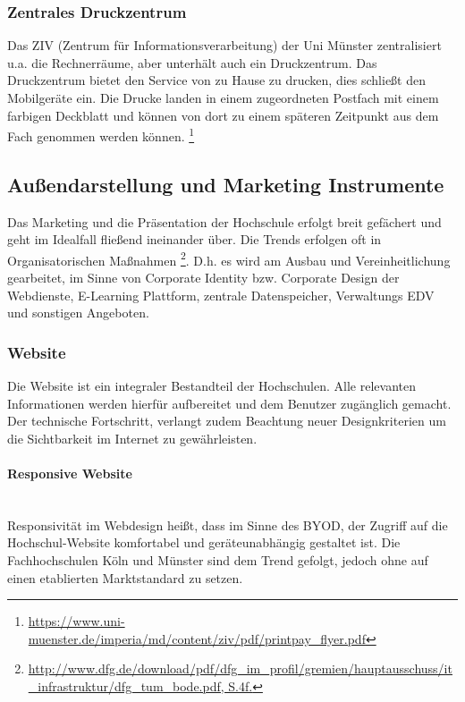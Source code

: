 \documentclass[a4paper, 12pt]{scrreprt}
\begin{document}
\subsubsection{Zentrales Druckzentrum}
Das ZIV (Zentrum für Informationsverarbeitung) der Uni Münster zentralisiert u.a. die Rechnerräume, aber unterhält auch ein Druckzentrum. Das Druckzentrum bietet den Service von zu Hause zu drucken, dies schließt den Mobilgeräte ein. Die Drucke landen in einem zugeordneten Postfach mit einem farbigen Deckblatt und können von dort zu einem späteren Zeitpunkt aus dem Fach genommen werden können.
\footnote{\url{https://www.uni-muenster.de/imperia/md/content/ziv/pdf/printpay_flyer.pdf}}

\subsection{Außendarstellung und Marketing Instrumente}
Das Marketing und die Präsentation der Hochschule erfolgt breit gefächert und geht im Idealfall fließend ineinander über. Die Trends erfolgen oft in Organisatorischen Maßnahmen \footnote{\url{http://www.dfg.de/download/pdf/dfg_im_profil/gremien/hauptausschuss/it_infrastruktur/dfg_tum_bode.pdf, S.4f.}}. D.h. es wird am Ausbau und Vereinheitlichung gearbeitet, im Sinne von Corporate Identity bzw. Corporate Design der Webdienste, E-Learning Plattform, zentrale Datenspeicher, Verwaltungs EDV und sonstigen Angeboten.

\subsubsection{Website}
Die Website ist ein integraler Bestandteil der Hochschulen. Alle relevanten Informationen werden hierfür aufbereitet und dem Benutzer zugänglich gemacht. Der technische Fortschritt, verlangt zudem Beachtung neuer Designkriterien um die Sichtbarkeit im Internet zu gewährleisten.

\paragraph{Responsive Website}\mbox{}\\ %
Responsivität im Webdesign heißt, dass im Sinne des BYOD, der Zugriff auf die Hochschul-Website komfortabel und geräteunabhängig gestaltet ist. Die Fachhochschulen Köln und Münster sind dem Trend gefolgt, jedoch ohne auf einen etablierten Marktstandard zu setzen.
\end{document}
